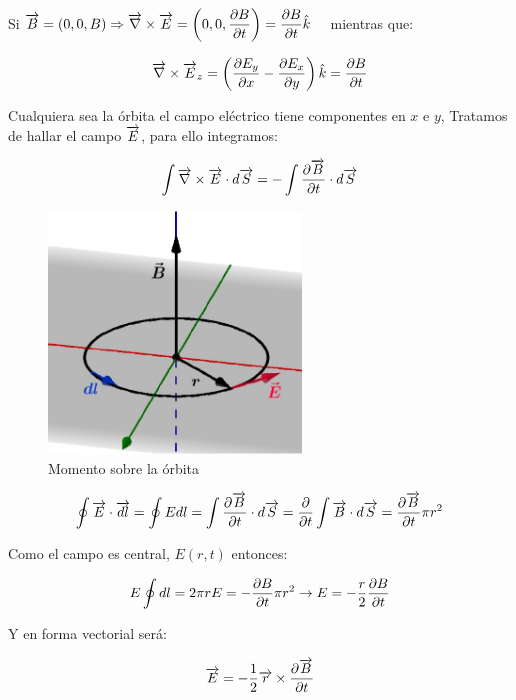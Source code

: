 Si $\V{B}=(0,0,B)\Rightarrow \Rotor{E}=\left( 0,0,\dP{B}{t} \right) = \dP{B}{t} \hat{k}\quad$ mientras que:


\begin{equation}
	\Rotor{E}_{z}= \left( \dP{E_{y}}{x} - \dP{E_{x}}{y} \right)\hat{k} = \dP{B}{t}
\end{equation}

Cualquiera sea la órbita el campo eléctrico tiene componentes en $x$ e $y$, Tratamos de hallar el campo $\V{E}$, para ello integramos:

\begin{equation}
	\int \Rotor{E} \cdot d\V{S}= -\int \dPv{B}{t} \cdot d\V{S}
\end{equation}



\begin{figure}[H]
    \centering
    \includegraphics[width=0.6\textwidth]{./Figures/fig_s20}
	\caption{Momento sobre la órbita}
	\label{fig:s20}
\end{figure}


\begin{equation}
	\oint \V{E} \cdot \V{dl} = \oint E dl = \int \dPv{B}{t} \cdot d\V{S} = \dfrac{\partial}{\partial t} \int\V{B}\cdot d\V{S} = \dPv{B}{t}\pi r^{2}
\end{equation}

Como el campo es central, $E(r,t)$ entonces:

\begin{equation}
	E \oint dl = 2\pi rE = -\dP{B}{t}\pi r^{2}\rightarrow E= -\dfrac{r}{2}\dP{B}{t}
\end{equation}

Y en forma vectorial será:

\begin{equation}
	\V{E} = -\dfrac{1}{2}\V{r} \times \dPv{B}{t}
\end{equation}


